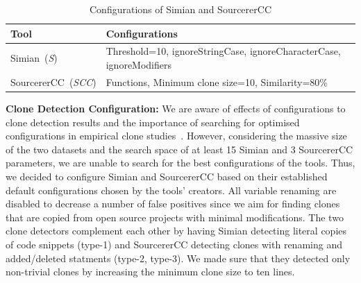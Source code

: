 \documentclass[10pt,journal,compsoc]{IEEEtran}
\begin{document}
\begin{table}
	\centering
	\caption{Configurations of Simian and SourcererCC}
	\label{t:param_tuning}
	\begin{tabular}{lp{5cm}}
		\toprule
		Tool & Configurations \\
		\midrule
		Simian~(\textit{S}) &  Threshold=10, ignoreStringCase, \newline ignoreCharacterCase, \newline ignoreModifiers \\ 
		\midrule
		SourcererCC~(\textit{SCC}) & Functions, Minimum clone size=10, \newline Similarity=80\% \\
		\bottomrule
	\end{tabular} %
\end{table}

\textbf{Clone Detection Configuration: } We are aware of effects of
configurations to clone detection results and the importance of searching for
optimised configurations in empirical clone
studies~\cite{Svajlenko2014,Wang2014,cr2016ssbse,Ragkhitwetsagul2016}. However,
considering the massive size of the two datasets and the search space of at
least 15 Simian and 3 SourcererCC parameters, we are unable to search for the
best configurations of the tools. Thus, we decided to configure Simian and
SourcererCC based on their established default configurations chosen by the
tools' creators. All variable renaming are disabled to decrease a number of
false positives since we aim for finding clones that are copied from open source
projects with minimal modifications. The two clone detectors complement each
other by having Simian detecting literal copies of code snippets (type-1) and SourcererCC
detecting clones with renaming and added/deleted statments (type-2, type-3). We made sure that they 
detected only non-trivial clones by increasing the minimum clone size to ten
lines.

\end{document}
